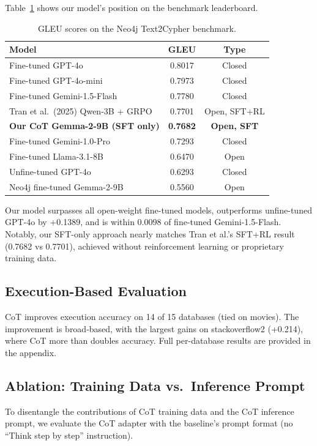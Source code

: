 \documentclass[11pt]{article}
\begin{document}
Table~\ref{tab:leaderboard} shows our model's position on the benchmark leaderboard.

\begin{table}[h]
\centering
\caption{GLEU scores on the Neo4j Text2Cypher benchmark.}
\label{tab:leaderboard}
\begin{tabular}{lcc}
\toprule
\textbf{Model} & \textbf{GLEU} & \textbf{Type} \\
\midrule
Fine-tuned GPT-4o & 0.8017 & Closed \\
Fine-tuned GPT-4o-mini & 0.7973 & Closed \\
Fine-tuned Gemini-1.5-Flash & 0.7780 & Closed \\
Tran et al.\ (2025) Qwen-3B + GRPO & 0.7701 & Open, SFT+RL \\
\textbf{Our CoT Gemma-2-9B (SFT only)} & \textbf{0.7682} & \textbf{Open, SFT} \\
Fine-tuned Gemini-1.0-Pro & 0.7293 & Closed \\
Fine-tuned Llama-3.1-8B & 0.6470 & Open \\
Unfine-tuned GPT-4o & 0.6293 & Closed \\
Neo4j fine-tuned Gemma-2-9B & 0.5560 & Open \\
\bottomrule
\end{tabular}
\end{table}

Our model surpasses all open-weight fine-tuned models, outperforms unfine-tuned GPT-4o by +0.1389, and is within 0.0098 of fine-tuned Gemini-1.5-Flash. Notably, our SFT-only approach nearly matches Tran et al.'s SFT+RL result (0.7682 vs 0.7701), achieved without reinforcement learning or proprietary training data.

\subsection{Execution-Based Evaluation}

CoT improves execution accuracy on 14 of 15 databases (tied on movies). The improvement is broad-based, with the largest gains on stackoverflow2 (+0.214), where CoT more than doubles accuracy. Full per-database results are provided in the appendix.

\subsection{Ablation: Training Data vs.\ Inference Prompt}

To disentangle the contributions of CoT training data and the CoT inference prompt, we evaluate the CoT adapter with the baseline's prompt format (no ``Think step by step'' instruction).
\end{document}
